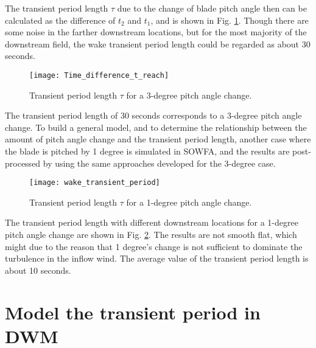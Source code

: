 \documentclass{umthesis}
\begin{document}
The transient period length $\tau$ due to the change of blade pitch angle then can be calculated as the difference of $t_2$ and $t_1$, and is shown in Fig. \ref{fig:Time_difference_t_reach}. Though there are some noise in the farther downstream locations, but for the most majority of the downstream field, the wake transient period length could be regarded as about 30 seconds.

\begin{figure}
  \centering
  \texttt{[image: Time\_difference\_t\_reach]}
  \caption{Transient period length $\tau$ for a 3-degree pitch angle change.}\label{fig:Time_difference_t_reach}
\end{figure}

The transient period length of 30 seconds corresponds to a 3-degree pitch angle change. To build a general model, and to determine the relationship between the amount of pitch angle change and the transient period length, another case where the blade is pitched by 1 degree is simulated in SOWFA, and the results are post-processed by using the same approaches developed for the 3-degree case.

\begin{figure}
  \centering
  \texttt{[image: wake\_transient\_period]}
  \caption{Transient period length $\tau$ for a 1-degree pitch angle change.}\label{fig:wake_transient_period}
\end{figure}

The transient period length with different downstream locations for a 1-degree pitch angle change are shown in Fig. \ref{fig:wake_transient_period}. The results are not smooth flat, which might due to the reason that 1 degree's change is not sufficient to dominate the turbulence in the inflow wind. The average value of the transient period length is about 10 seconds.



\section{Model the transient period in DWM}\label{sec:DWM_transient}
\end{document}
